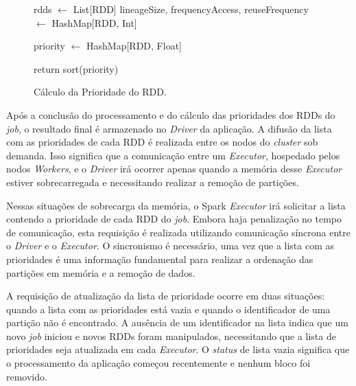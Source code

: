 \begin{figure}[!ht]
    \begin{algorithm}[H]
        \caption{Cálculo da Prioridade do RDD.}
        \label{alg:calculo-prioridade-rdds}
        rdds $\leftarrow$ List[RDD]\;
        lineageSize, frequencyAccess, reuseFrequency $\leftarrow$ HashMap[RDD, Int]\;
        
         {
           priority $\leftarrow$ HashMap[RDD, Float]\;
           
           return sort(priority)\;
        }
    \end{algorithm}
\end{figure}

Após a conclusão do processamento e do cálculo das prioridades dos RDDs do \textit{job}, o resultado final é armazenado no \textit{Driver} da aplicação. A difusão da lista com as prioridades de cada RDD é realizada entre os nodos do \textit{cluster} sob demanda. Isso significa que a comunicação entre um \textit{Executor}, hospedado pelos nodos \textit{Workers}, e o \textit{Driver} irá ocorrer apenas quando a memória desse \textit{Executor} estiver sobrecarregada e necessitando realizar a remoção de partições. 

Nessas situações de sobrecarga da memória, o Spark \textit{Executor} irá solicitar a lista contendo a prioridade de cada RDD do \textit{job}. Embora haja penalização no tempo de comunicação, esta requisição é realizada utilizando comunicação síncrona entre o \textit{Driver} e o \textit{Executor}. O sincronismo é necessário, uma vez que a lista com as prioridades é uma informação fundamental para realizar a ordenação das partições em memória e a remoção de dados.


A requisição de atualização da lista de prioridade ocorre em duas situações: quando a lista com as prioridades está vazia e quando o identificador de uma partição não é encontrado. A ausência de um identificador na lista indica que um novo \textit{job} iniciou e novos RDDs foram manipulados, necessitando que a lista de prioridades seja atualizada em cada \textit{Executor}. O \textit{status} de lista vazia significa que o processamento da aplicação começou recentemente e nenhum bloco foi removido. 


